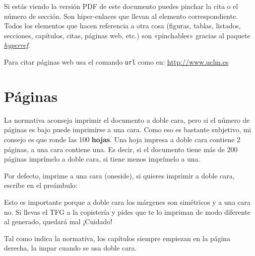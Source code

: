 Si estás viendo la versión PDF de este documento puedes pinchar la cita o el número de
sección. Son hiper-enlaces que llevan al elemento correspondiente. Todos los elementos que
hacen referencia a otra cosa (figuras, tablas, listados, secciones, capítulos, citas,
páginas web, etc.) son «pinchables» gracias al paquete
\href{http://latex.tugraz.at/_media/docs/hyperref.pdf}{\emph{hyperref}}.

Para citar páginas web usa el comando \texttt{url} como en: \url{http://www.uclm.es}


\section{Páginas}
\label{sec:paginas}

La normativa aconseja imprimir el documento a doble cara, pero si el número de
páginas es bajo puede imprimirse a una cara. Como eso es bastante subjetivo, mi
consejo es que ronde las 100 \textbf{hojas}. Una hoja impresa a doble cara
contiene 2 páginas, a una cara contiene una. Es decir, si el documento tiene más
de 200 páginas imprímelo a doble cara, si tiene menos imprímelo a una.

Por defecto, \esitfg{} imprime a una cara (oneside), si quieres imprimir a doble cara,
escribe en el preámbulo:


Esto es importante porque a doble cara los márgenes son simétricos y a una cara
no. Si llevas el TFG a la copistería y pides que te lo impriman de modo
diferente al generado, quedará mal ¡Cuidado!

Tal como indica la normativa, los capítulos siempre empiezan en la página
derecha, la impar cuando se usa doble cara.


